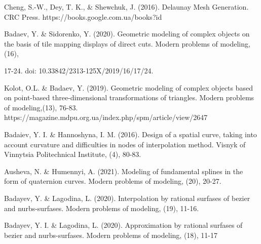 \documentclass[12pt,a4paper]{article}
\begin{document}
\par
Cheng, S.-W., Dey, T. K., \& Shewchuk, J. (2016). Delaunay Mesh Generation. CRC Press. https://books.google.com.ua/books?id
\par
Badaev, Y. \& Sidorenko, Y. (2020). Geometric modeling of complex objects on the basis of tile mapping displays of direct cuts. Modern problems of modeling, (16),
\par
17-24. doi: 10.33842/2313-125X/2019/16/17/24.
\par
Kolot, O.L. \& Badaev, Y. (2019). Geometric modeling of complex objects based on point-based three-dimensional transformations of triangles. Modern problems of modeling,(13), 76-83. https://magazine.mdpu.org.ua/index.php/spm/article/view/2647
\par
Badaiev, Y. I. \& Hannoshyna, I. M. (2016). Design of a spatial curve, taking into account curvature and difficulties in nodes of interpolation method. Visnyk of Vinnytsia Politechnical Institute, (4), 80-83.
\par
Ausheva, N. \& Humennyi, A. (2021). Modeling of fundamental splines in the form of quaternion curves. Modern problems of modeling, (20), 20-27.
\par
Badayev, Y. \& Lagodina, L. (2020). Interpolation by rational surfases of bezier and nurbs-surfases. Modern problems of modeling, (19), 11-16.
\par
Badayev, Y. I. \& Lagodina, L. (2020). Approximation by rational surfases of bezier and nurbs-surfases. Modern problems of modeling, (18), 11-17
\par
\end{document}
